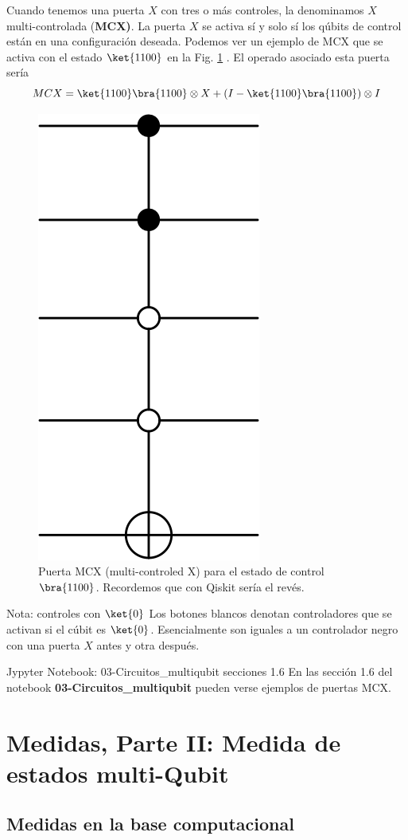 \documentclass[a4paper,11pt]{book} %
\numberwithin{equation}{chapter}
\begin{document}
Cuando tenemos una puerta $X$ con tres o más controles, la denominamos $X$ multi-controlada (\textbf{MCX)}. La puerta $X$ se activa sí y solo sí los qúbits de control están en una configuración deseada. Podemos ver un ejemplo de MCX que se activa con el estado $\ket{1100}$ en la Fig. \ref{Fig_multiqubit_MCX_gate}  . El operado asociado esta puerta sería
$$
MCX = \ket{1100}  \bra{1100}\otimes X + (I-\ket{1100}\bra{1100}) \otimes I
$$

	\begin{figure}[H]
	\centering 
	\includegraphics[width=0.1\linewidth]{Figuras/Fig_multiqubit_MCX_gate}
	\caption{Puerta MCX (multi-controled X) para el estado de control $\bra{1100}$. Recordemos que con Qiskit sería el revés.}
	\label{Fig_multiqubit_MCX_gate}
	\end{figure}

	\begin{mybox_blue}{Nota: controles con $\ket{0}$}
	Los botones blancos denotan controladores que se activan si el cúbit es $\ket{0}$. Esencialmente son iguales 
	a un controlador negro con una puerta $X$ antes y otra después.
	\end{mybox_blue}

	\begin{mybox_orange}{Jypyter Notebook: 03-Circuitos\_multiqubit secciones 1.6}
	En las sección 1.6 del notebook \textbf{03-Circuitos\_multiqubit} pueden verse ejemplos de puertas MCX.
	\end{mybox_orange}

    



















\chapter{Medidas, Parte II: Medida de estados multi-Qubit}

	\section{Medidas en la base computacional}
\end{document}
